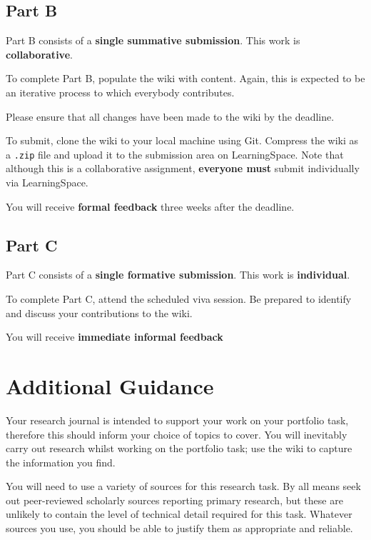 \documentclass{../../fal_assignment}
\begin{document}
	\subsection*{Part B}
	
	Part B consists of a \textbf{single summative submission}. This work is \textbf{collaborative}.
	
	To complete Part B, populate the wiki with content.
	Again, this is expected to be an iterative process to which everybody contributes.
	
	Please ensure that all changes have been made to the wiki by the deadline.
	
	To submit, clone the wiki to your local machine using Git.
	Compress the wiki as a \texttt{.zip} file and upload it to the submission area on LearningSpace.
	Note that although this is a collaborative assignment,
	\textbf{everyone must} submit individually via LearningSpace.
	
	You will receive \textbf{formal feedback} three weeks after the deadline.
	
	\subsection*{Part C}
	
	Part C consists of a \textbf{single formative submission}. This work is \textbf{individual}.
	
	To complete Part C, attend the scheduled viva session.
	Be prepared to identify and discuss your contributions to the wiki.
	
	You will receive \textbf{immediate informal feedback}
		
	\section*{Additional Guidance}
	
	Your research journal is intended to support your work on your portfolio task,
	therefore this should inform your choice of topics to cover.
	You will inevitably carry out research whilst working on the portfolio task;
	use the wiki to capture the information you find.
	
	You will need to use a variety of sources for this research task.
	By all means seek out peer-reviewed scholarly sources reporting primary research,
	but these are unlikely to contain the level of technical detail required for this task.
	Whatever sources you use, you should be able to justify them as appropriate and reliable.
	
\end{document}
